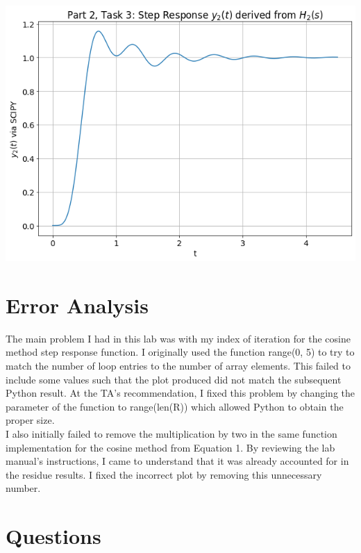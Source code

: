 \documentclass[12pt]{report}
\begin{document}
\begin{center}
	\includegraphics[scale = 0.6]{Lab 6 - Plots/Part2-Task3.png}\\[1.0 cm]
\end{center}

\section{Error Analysis}

The main problem I had in this lab was with my index of iteration for the cosine method step response function. I originally used the function range(0, 5) to try to match the number of loop entries to the number of array elements. This failed to include some values such that the plot produced did not match the subsequent Python result. At the TA's recommendation, I fixed this problem by changing the parameter of the function to range(len(R)) which allowed Python to obtain the proper size. \\

I also initially failed to remove the multiplication by two in the same function implementation for the cosine method from Equation 1. By reviewing the lab manual's instructions, I came to understand that it was already accounted for in the residue results. I fixed the incorrect plot by removing this unnecessary number. \\
	
\section{Questions}
\end{document}
